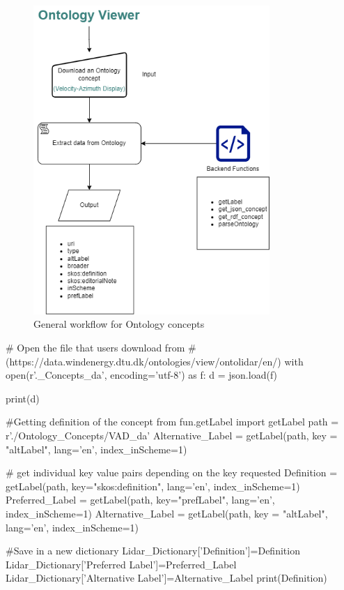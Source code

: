 \documentclass[remotesensing,article,submit,pdftex,moreauthors]{Definitions/mdpi}
\begin{document}
\begin{figure}
    \centering
    \includegraphics[width=0.8\textwidth]{Figures/Ontology_flow.png}
    \caption{General workflow for Ontology concepts}
    \label{Ontology_workflow}
\end{figure}

\begin{python}
# Open the file that users download from 
#  (https://data.windenergy.dtu.dk/ontologies/view/ontolidar/en/)
with open(r'.\Ontology_Concepts\VAD_da', encoding='utf-8') as f:
    d = json.load(f)

print(d)
\end{python}

\begin{python}
#Getting definition of the concept
from fun.getLabel import getLabel
path = r'./Ontology_Concepts/VAD_da'
Alternative_Label = getLabel(path, key = "altLabel", lang='en', index_inScheme=1)

# get individual key value pairs depending on the key requested
Definition = getLabel(path, key="skos:definition", lang='en', index_inScheme=1)
Preferred_Label = getLabel(path, key="prefLabel", lang='en', index_inScheme=1)
Alternative_Label = getLabel(path, key = "altLabel", lang='en', index_inScheme=1)

#Save in a new dictionary
Lidar_Dictionary['Definition']=Definition
Lidar_Dictionary['Preferred Label']=Preferred_Label
Lidar_Dictionary['Alternative Label']=Alternative_Label
print(Definition)
\end{python}
\end{document}
